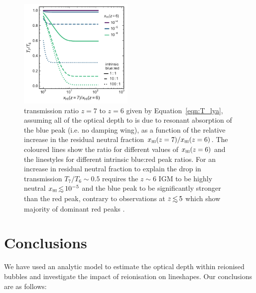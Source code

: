 \documentclass[fleqn,usenatbib]{mnras}
\begin{document}
\begin{figure}
    \includegraphics[width=0.49\textwidth]{figs/fig9.pdf}
    \caption{\lya transmission ratio $z=7$ to $z=6$ given by Equation~\eqref{eqn:T_lya}, assuming all of the optical depth to \lya is due to resonant absorption of the blue peak (i.e. no damping wing), as a function of the relative increase in the residual neutral fraction $\xHI(z=7)/\xHI(z=6)$. The coloured lines show the ratio for different values of $\xHI(z=6)$ and the linestyles for different intrinsic blue:red peak ratios. For an increase in residual neutral fraction to explain the drop in \lya transmission $T_7/T_6 \sim 0.5$ requires the $z\sim6$ IGM to be highly neutral $\xHI \simlt 10^{-5}$ and the blue peak to be significantly stronger than the red peak, contrary to observations at $z\simlt5$ which show majority of dominant red peaks \citep[e.g.,][]{Trainor2015,Rivera-Thorsen2015,Yang2017a,Steidel2018}.}
    \label{fig:T_resonant}
\end{figure}

\section{Conclusions}
\label{sec:conc}

We have used an analytic model to estimate the \lya optical depth within reionised bubbles and investigate the impact of reionisation on \lya lineshapes. Our conclusions are as follows:
\end{document}
